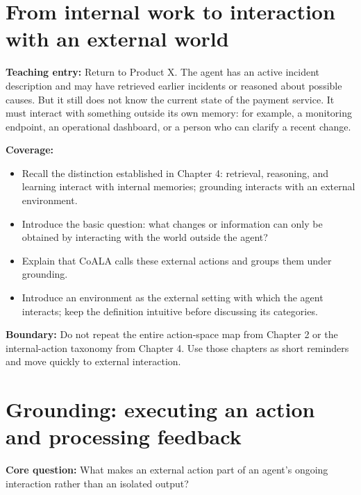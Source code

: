\section{From internal work to interaction with an external world}
\textbf{Teaching entry:} Return to Product X. The agent has an active incident description and may have retrieved earlier incidents or reasoned about possible causes. But it still does not know the current state of the payment service. It must interact with something outside its own memory: for example, a monitoring endpoint, an operational dashboard, or a person who can clarify a recent change.

\textbf{Coverage:}
\begin{itemize}
  \item Recall the distinction established in Chapter 4: retrieval, reasoning, and learning interact with internal memories; grounding interacts with an external environment.
  \item Introduce the basic question: what changes or information can only be obtained by interacting with the world outside the agent?
  \item Explain that CoALA calls these external actions and groups them under grounding.
  \item Introduce an environment as the external setting with which the agent interacts; keep the definition intuitive before discussing its categories.
\end{itemize}

\textbf{Boundary:} Do not repeat the entire action-space map from Chapter 2 or the internal-action taxonomy from Chapter 4. Use those chapters as short reminders and move quickly to external interaction. 

\section{Grounding: executing an action and processing feedback}
\textbf{Core question:} What makes an external action part of an agent's ongoing interaction rather than an isolated output?

